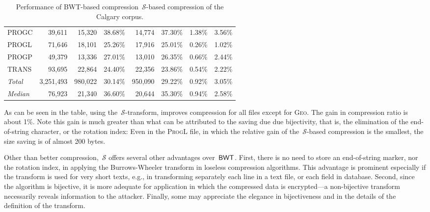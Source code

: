 \documentclass[a4paper,12pt]{article}
\newcommand{\alg}[1]{{\textup{\textsf{#1}}}}
\newcommand{\Acronym}{\ensuremath{\mathcal{S}}}
\newcommand{\BWT}{\alg{BWT}}
\numberwithin{algorithm}{section}
\begin{document}
\begin{table}[hbt]
\begin{center}
\begin{tabular}{| l | r | r r| r r| r r|}
\textsc{PROGC}   &   39,611  &   15,320  &   38.68\%  &   14,774  &   37.30\%  &   1.38\% &  3.56\%   \\
\textsc{PROGL}   &   71,646  &   18,101  &   25.26\%  &   17,916  &   25.01\%  &   0.26\%&   1.02\%   \\
\textsc{PROGP}   &   49,379  &   13,336  &   27.01\%  &   13,010  &   26.35\%  &   0.66\% &  2.44\%   \\
\textsc{TRANS}   &   93,695  &   22,864  &   24.40\%  &   22,356  &   23.86\%  &   0.54\%  & 2.22\%   \\  \hline
\emph{Total}   &   3,251,493   &   980,022 &   30.14\%  &   950,090 &   29.22\%  &   0.92\%  & 3.05\%   \\  \hline
\emph{Median}   &   76,923  &    21,340   &   36.60\%  &   20,644  &   35.30\%  &   0.94\% &  2.58\%   \\  \hline

\end{tabular}
\end{center}
\caption{Performance of BWT-based compression~$\Acronym$-based compression of the Calgary corpus.}
\label{Table:comparison}
\end{table}


As can be seen in the table, using the~$\Acronym$-transform, improves compression for all files except for \textsc{Geo}.
The gain in compression ratio is about 1\%.
Note this gain is much greater than what can be attributed to the saving due
  due bijectivity, that is, the elimination of the end-of-string character, or
  the rotation index: Even in the \textsc{ProgL} file, in which the relative gain
  of the~$\Acronym$-based compression is the smallest, the size saving is
  of almost 200 bytes.

Other than better compression,~$\Acronym$ offers several other
  advantages over~$\BWT$.
First, there is no need to store an end-of-string marker, nor the rotation index,
  in applying the Burrows-Wheeler transform in loseless compression algorithms.
This advantage is prominent especially if the transform is used for very
  short texts, e.g., in transforming
  separately each line in a text file, or each field in database.
Second, since the algorithm is bijective, it is more adequate for application in which the compressed data
  is encrypted---a non-bijective transform necessarily reveals information to the attacker.
Finally, some may appreciate the elegance in bijectiveness and in the details of the definition of the transform.
\end{document}
